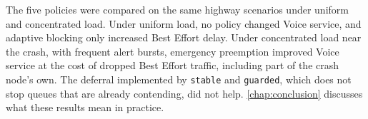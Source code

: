 The five policies were compared on the same highway scenarios under uniform and concentrated load.
Under uniform load, no policy changed Voice service, and adaptive blocking only increased Best Effort delay.
Under concentrated load near the crash, with frequent alert bursts, emergency preemption improved Voice service at the cost of dropped Best Effort traffic, including part of the crash node's own.
The deferral implemented by \texttt{stable} and \texttt{guarded}, which does not stop queues that are already contending, did not help.
\autoref{chap:conclusion} discusses what these results mean in practice.

